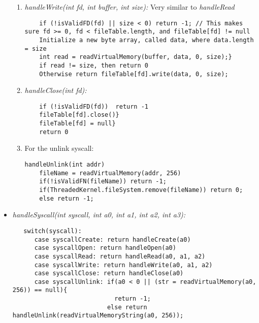 \documentclass{article}
\begin{document}
\begin{itemize}
\begin{enumerate}
\item \textit{handleWrite(int fd, int buffer, int size):} Very similar to \textit{handleRead}
\begin{verbatim}
    if (!isValidFD(fd) || size < 0) return -1; // This makes sure fd >= 0, fd < fileTable.length, and fileTable[fd] != null
    Initialize a new byte array, called data, where data.length = size
    int read = readVirtualMemory(buffer, data, 0, size);}
    if read != size, then return 0
    Otherwise return fileTable[fd].write(data, 0, size);
\end{verbatim}

\item \textit{handleClose(int fd):}
\begin{verbatim}
    if (!isValidFD(fd))  return -1
    fileTable[fd].close()}
    fileTable[fd] = null}
    return 0
\end{verbatim}

\item For the unlink syscall:
\begin{verbatim}
handleUnlink(int addr)
    fileName = readVirtualMemory(addr, 256)
    if(!isValidFN(fileName)) return -1;
    if(ThreadedKernel.fileSystem.remove(fileName)) return 0;
    else return -1;
\end{verbatim}
\end{enumerate}

\item \textit{handleSyscall(int syscall, int a0, int a1, int a2, int a3):}
  \begin{verbatim}
   switch(syscall):
      case syscallCreate: return handleCreate(a0)
      case syscallOpen: return handleOpen(a0)
      case syscallRead: return handleRead(a0, a1, a2) 
      case syscallWrite: return handleWrite(a0, a1, a2)
      case syscallClose: return handleClose(a0)
      case syscallUnlink: if(a0 < 0 || (str = readVirtualMemory(a0, 256)) == null){
                            return -1;
                          else return handleUnlink(readVirtualMemoryString(a0, 256)); 
  \end{verbatim}

\end{itemize}
\end{document}
